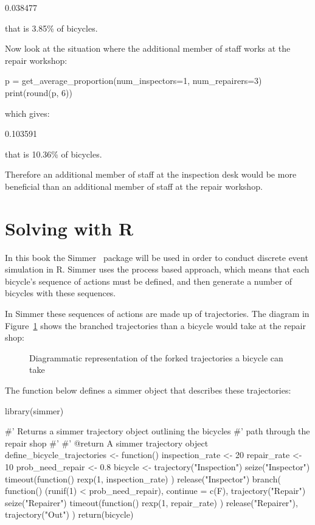 \begin{pyout}
0.038477
\end{pyout}

that is 3.85\% of bicycles.

Now look at the situation where the additional member of staff works at the
repair workshop:

\begin{pyin}
p = get_average_proportion(num_inspectors=1, num_repairers=3)
print(round(p, 6))
\end{pyin}

which gives:

\begin{pyout}
0.103591
\end{pyout}

that is 10.36\% of bicycles.

Therefore an additional member of staff at the inspection desk would be more
beneficial than an additional member of staff at the repair workshop.


\section{Solving with R}\label{sec:discrete_event_simulation_solving-with-R}

In this book the Simmer~\cite{ucar2019simmer} package will be used in order to conduct discrete event
simulation in R. Simmer uses the process based approach, which means that each
bicycle's sequence of actions must be defined, and then generate a number of
bicycles with these sequences.

In Simmer these sequences of actions are made up of trajectories. The
diagram in Figure~\ref{fig:processbased_diagram} shows the branched
trajectories than a bicycle would take at the repair shop:

\begin{figure}
\begin{center}

\caption{Diagrammatic representation of the forked trajectories a bicycle can take}
\label{fig:processbased_diagram}
\end{center}
\end{figure}

The function below defines a simmer object that describes these trajectories:

\begin{Rin}
library(simmer)

#' Returns a simmer trajectory object outlining the bicycles
#' path through the repair shop
#'
#' @return A simmer trajectory object
define_bicycle_trajectories <- function() {
  inspection_rate <- 20
  repair_rate <- 10
  prob_need_repair <- 0.8
  bicycle <-
    trajectory("Inspection") %
    seize("Inspector") %
    timeout(function() {
      rexp(1, inspection_rate)
    }) %
    release("Inspector") %
    branch(
      function() (runif(1) < prob_need_repair),
      continue = c(F),
      trajectory("Repair") %
        seize("Repairer") %
        timeout(function() {
          rexp(1, repair_rate)
        }) %
        release("Repairer"),
      trajectory("Out")
    )
  return(bicycle)
}
\end{Rin}

